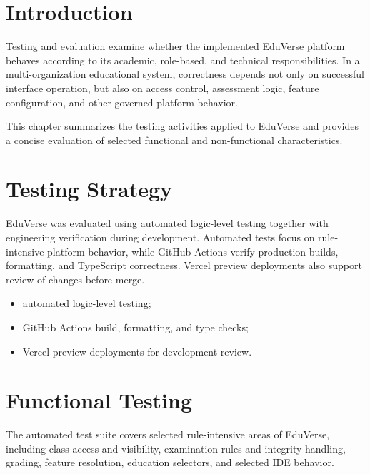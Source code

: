 
\section{Introduction}\label{sec:testing_evaluation_introduction}

Testing and evaluation examine whether the implemented EduVerse platform
behaves according to its academic, role-based, and technical responsibilities.
In a multi-organization educational system, correctness depends not only on
successful interface operation, but also on access control, assessment logic,
feature configuration, and other governed platform behavior.

This chapter summarizes the testing activities applied to EduVerse and
provides a concise evaluation of selected functional and non-functional
characteristics.

\section{Testing Strategy}\label{sec:testing_strategy}

EduVerse was evaluated using automated logic-level testing together with
engineering verification during development. Automated tests focus on
rule-intensive platform behavior, while GitHub Actions verify production
builds, formatting, and TypeScript correctness. Vercel preview deployments
also support review of changes before merge.

\begin{itemize}
  \item automated logic-level testing;
  \item GitHub Actions build, formatting, and type checks;
  \item Vercel preview deployments for development review.
\end{itemize}

\section{Functional Testing}\label{sec:functional_testing}

The automated test suite covers selected rule-intensive areas of EduVerse,
including class access and visibility, examination rules and integrity
handling, grading, feature resolution, education selectors, and selected IDE
behavior.

